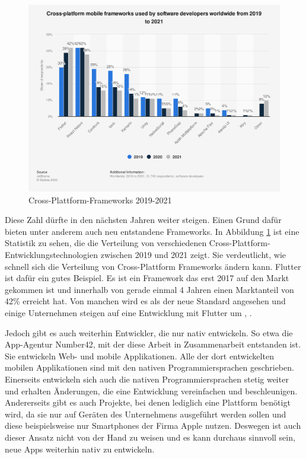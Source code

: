 \begin{figure}[ht]
  \centering
  \includegraphics[width=15cm,keepaspectratio]{images/cross-platform-mobile-frameworks.png} 
  \caption[Statistik Cross-Plattform-Frameworks]{Cross-Plattform-Frameworks 2019-2021 \cite{statist_CP_Framework}}
  \label{fig:statista_cross_plattform}
\end{figure}

Diese Zahl dürfte in den nächsten Jahren weiter steigen. Einen Grund dafür bieten unter anderem auch neu entstandene Frameworks. In Abbildung \ref{fig:statista_cross_plattform} ist eine Statistik zu sehen, die die Verteilung von verschiedenen Cross-Plattform-Entwicklungstechnologien zwischen 2019 und 2021 zeigt. Sie verdeutlicht, wie schnell sich die Verteilung von Cross-Plattform Frameworks ändern kann. Flutter ist dafür ein gutes Beispiel. Es ist ein Framework das erst 2017 auf den Markt gekommen ist und innerhalb von gerade einmal 4 Jahren einen Marktanteil von 42\% erreicht hat. Von manchen wird es als der neue Standard angesehen und einige Unternehmen steigen auf eine Entwicklung mit Flutter um \cite{flutter_move_to}, \cite{flutter_move_to_dart}. 

Jedoch gibt es auch weiterhin Entwickler, die nur nativ entwickeln. So etwa die App-Agentur Number42, mit der diese Arbeit in Zusammenarbeit entstanden ist. Sie entwickeln Web- und mobile Applikationen. Alle der dort entwickelten mobilen Applikationen sind mit den nativen Programmiersprachen geschrieben. Einerseits entwickeln sich auch die nativen Programmiersprachen stetig weiter und erhalten Änderungen, die eine Entwicklung vereinfachen und beschleunigen. Andererseits gibt es auch Projekte, bei denen lediglich eine Plattform benötigt wird, da sie nur auf Geräten des Unternehmens ausgeführt werden sollen und diese beispielsweise nur Smartphones der Firma Apple nutzen. Deswegen ist auch dieser Ansatz nicht von der Hand zu weisen und es kann durchaus sinnvoll sein, neue Apps weiterhin nativ zu entwickeln.

